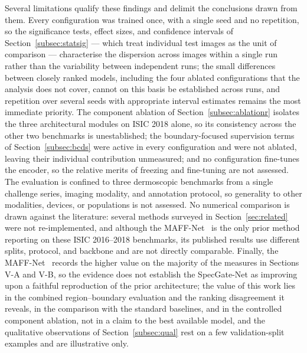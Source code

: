 Several limitations qualify these findings and delimit the conclusions drawn from them. Every configuration was trained once, with a single seed and no repetition, so the significance tests, effect sizes, and confidence intervals of Section~\ref{subsec:statsig} --- which treat individual test images as the unit of comparison --- characterise the dispersion across images within a single run rather than the variability between independent runs; the small differences between closely ranked models, including the four ablated configurations that the analysis does not cover, cannot on this basis be established across runs, and repetition over several seeds with appropriate interval estimates remains the most immediate priority. The component ablation of Section~\ref{subsec:ablationr} isolates the three architectural modules on ISIC 2018 alone, so its consistency across the other two benchmarks is unestablished; the boundary-focused supervision terms of Section~\ref{subsec:bcds} were active in every configuration and were not ablated, leaving their individual contribution unmeasured; and no configuration fine-tunes the encoder, so the relative merits of freezing and fine-tuning are not assessed. The evaluation is confined to three dermoscopic benchmarks from a single challenge series, imaging modality, and annotation protocol, so generality to other modalities, devices, or populations is not assessed. No numerical comparison is drawn against the literature: several methods surveyed in Section~\ref{sec:related} were not re-implemented, and although the MAFF-Net~\cite{ref15} is the only prior method reporting on these ISIC 2016--2018 benchmarks, its published results use different splits, protocol, and backbone and are not directly comparable. Finally, the MAFF-Net~\cite{ref15} records the higher value on the majority of the measures in Sections V-A and V-B, so the evidence does not establish the SpecGate-Net as improving upon a faithful reproduction of the prior architecture; the value of this work lies in the combined region--boundary evaluation and the ranking disagreement it reveals, in the comparison with the standard baselines, and in the controlled component ablation, not in a claim to the best available model, and the qualitative observations of Section~\ref{subsec:qual} rest on a few validation-split examples and are illustrative only.
